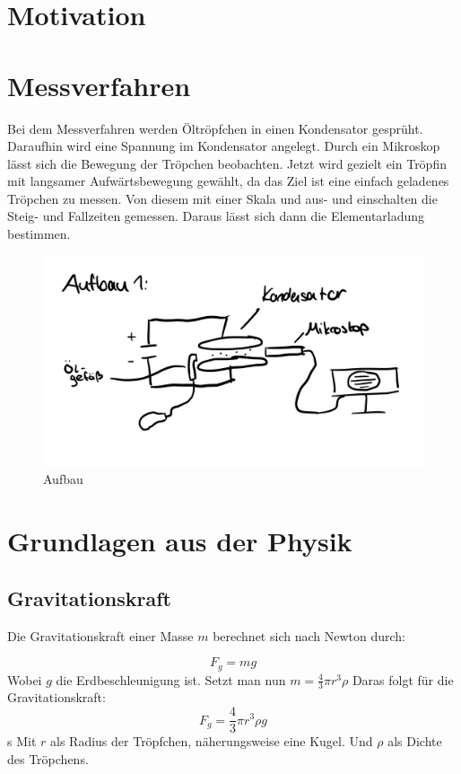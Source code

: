 \section{Motivation}



\section{Messverfahren}
Bei dem Messverfahren werden Öltröpfchen in einen Kondensator gesprüht. Daraufhin wird eine Spannung im Kondensator angelegt.
Durch ein Mikroskop lässt sich die Bewegung der Tröpchen beobachten. Jetzt wird gezielt ein Tröpfin mit langsamer Aufwärtsbewegung gewählt, da das Ziel ist eine einfach geladenes Tröpchen zu messen.
Von diesem mit einer Skala und aus- und einschalten die Steig- und Fallzeiten gemessen.
Daraus lässt sich dann die Elementarladung bestimmen.

\begin{figure}[h!]
    \centering
    \includegraphics[width = .5\textwidth]{Aufbau.jpeg}
    \caption{Aufbau}
\end{figure}

\section{Grundlagen aus der Physik}
\subsection{Gravitationskraft}

Die Gravitationskraft einer Masse $m$ berechnet sich nach Newton durch:

\begin{equation}
    F_g = mg
\end{equation}
Wobei $g$ die Erdbeschleunigung ist. Setzt man nun $m=\frac{4}{3}\pi r^3 \rho$
Daras folgt für die Gravitationskraft:
\begin{equation}
    F_g = \frac{4}{3}\pi r^3 \rho g
\end{equation}s
Mit $r$ als Radius der Tröpfchen, näherungsweise eine Kugel. Und $\rho$ als Dichte des Tröpchens.
